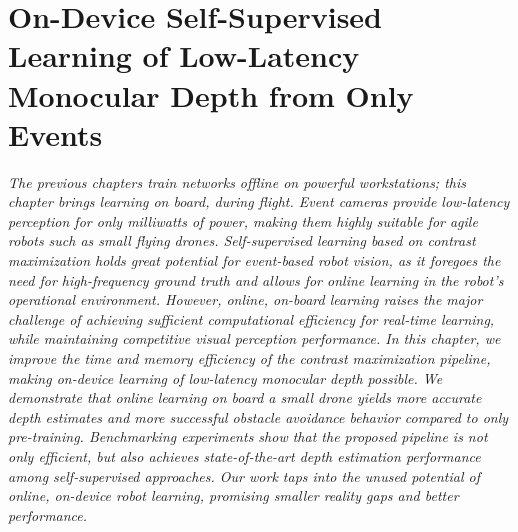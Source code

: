 \chapter{On-Device Self-Supervised Learning of Low-Latency Monocular Depth from Only Events}
\label{ch:cvpr}

{\it
The previous chapters train networks offline on powerful workstations; this chapter brings learning on board, during flight. Event cameras provide low-latency perception for only milliwatts of power, making them highly suitable for agile robots such as small flying drones. Self-supervised learning based on contrast maximization holds great potential for event-based robot vision, as it foregoes the need for high-frequency ground truth and allows for online learning in the robot's operational environment. However, online, on-board learning raises the major challenge of achieving sufficient computational efficiency for real-time learning, while maintaining competitive visual perception performance. In this chapter, we improve the time and memory efficiency of the contrast maximization pipeline, making on-device learning of low-latency monocular depth possible. We demonstrate that online learning on board a small drone yields more accurate depth estimates and more successful obstacle avoidance behavior compared to only pre-training. Benchmarking experiments show that the proposed pipeline is not only efficient, but also achieves state-of-the-art depth estimation performance among self-supervised approaches. Our work taps into the unused potential of online, on-device robot learning, promising smaller reality gaps and better performance.
}


